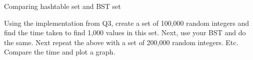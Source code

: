 Comparing hashtable set and BST set

Using the implementation from Q3, create a set of 100,000 random integers
and find the time taken to find 1,000 values in this set.
Next, use your BST and do the same.
Next repeat the above with
a set of 200,000 random integers.
Etc.
Compare the time and plot a graph.
